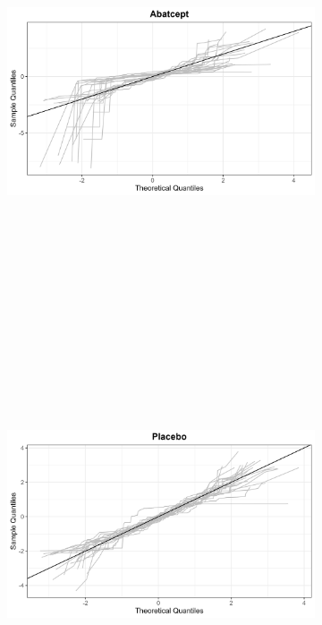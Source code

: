 \documentclass{report}
\begin{document}
\begin{figure}[!ht]
{\begin{minipage}{\textwidth}
				\vspace{0.4cm}   %
				
				\begin{subfigure}[b]{0.45\textwidth}   
					\centering
					\includegraphics[width=\textwidth, height=12cm]{Figures/Application/analysis/qq_plot_treatment.png}
				\end{subfigure}
				\hspace{0.35cm}  %
				\begin{subfigure}[b]{0.45\textwidth}   
					\centering
					\includegraphics[width=\textwidth, height=12cm]{Figures/Application/analysis/qq_plot_placebo.png}

\end{subfigure}
\end{minipage}}
\end{figure}
\end{document}
